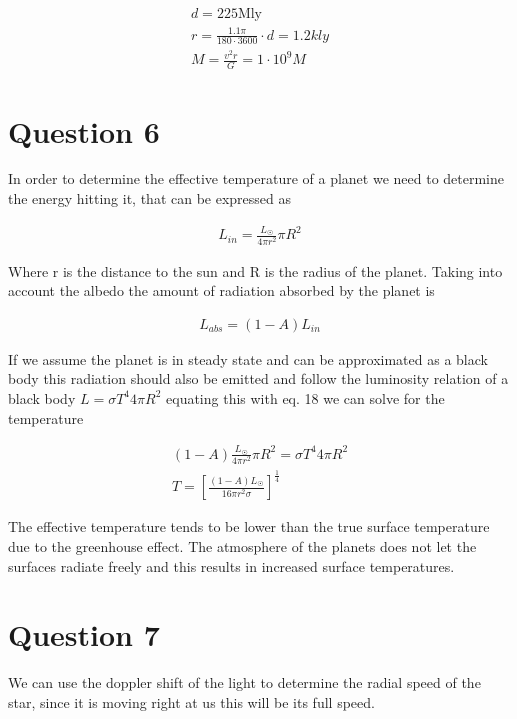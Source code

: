 \documentclass[a4paper]{article}
\begin{document}
\begin{align}
    d = 225 \text{Mly} \\ 
    r = \frac{1.1 \pi}{180 \cdot 3600} \cdot d = 1.2 kly \\
    M = \frac{v^2r}{G} = 1 \cdot 10^9 M
\end{align}

\section*{Question 6}

In order to determine the effective temperature of a planet we need to determine the energy hitting it, that can be expressed as

\begin{align}
    L_{in} = \frac{L_{\Sun}}{4\pi r^2} \pi R^2
\end{align}

Where r is the distance to the sun and R is the radius of the planet. Taking into account the albedo the amount of radiation absorbed by the planet is

\begin{align}
    L_{abs} = (1-A)L_{in}
\end{align}

If we assume the planet is in steady state and can be approximated as a black body this radiation should also be emitted and follow the luminosity relation of a black body $L = \sigma T^4 4 \pi R^2$ equating this with eq. 18 we can solve for the temperature

\begin{align}
    (1-A)\frac{L_{\Sun}}{4\pi r^2} \pi R^2 = \sigma T^4 4 \pi R^2 \\
    T = \left [\frac{(1-A)L_{\Sun}}{16\pi r^2 \sigma} \right ]^{\frac{1}{4}}
\end{align}

The effective temperature tends to be lower than the true surface temperature due to the greenhouse effect. The atmosphere of the planets does not let the surfaces radiate freely and this results in increased surface temperatures. 

\pagebreak

\section*{Question 7}

We can use the doppler shift of the light to determine the radial speed of the star, since it is moving right at us this will be its full speed. 
\end{document}
